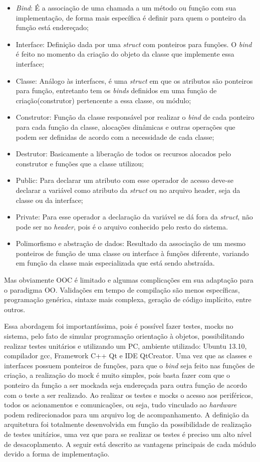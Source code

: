 \begin{itemize}
\item \emph{Bind}: É a associação de uma chamada a um método ou função com sua implementação, de forma mais específica é definir para quem o ponteiro da função está endereçado;
\item Interface: Definição dada por uma \emph{struct} com ponteiros para funções. O \emph{bind} é feito no momento da criação do objeto da classe que implemente essa interface;
\item Classe: Análogo às interfaces, é uma \emph{struct} em que os atributos são ponteiros para função, entretanto tem os \emph{binds} definidos em uma função de criação(construtor) pertencente a essa classe, ou módulo;
\item Construtor: Função da classe responsável por realizar o \emph{bind} de cada ponteiro para cada função da classe, alocações dinâmicas e outras operações que podem ser definidas de acordo com a necessidade de cada classe;
\item Destrutor: Basicamente a liberação de todos os recursos alocados pelo construtor e funções que a classe utilizou;
\item Public: Para declarar um atributo com esse operador de acesso deve-se declarar a variável como atributo da \emph{struct} ou no arquivo header, seja da classe ou da interface;
\item Private: Para esse operador a declaração da variável se dá fora da \emph{struct}, não pode ser no \emph{header}, pois é o arquivo conhecido pelo resto do sistema.
\item Polimorfismo e abstração de dados: Resultado da associação de um mesmo ponteiros de função de uma classe ou interface à funções diferente, variando em função da classe mais especializada que está sendo abstraída.
\end{itemize}

Mas obviamente OOC é limitado e algumas complicações em sua adaptação para o paradigma OO. Validações em tempo de compilação são menos específicas, programação genérica, sintaxe mais complexa, geração de código implícito, entre outros.

Essa abordagem foi importantíssima, pois é possível fazer testes, mocks no sistema, pelo fato de simular programação orientação à objetos, possibilitando realizar testes unitários e utilizando um PC, ambiente utilizado: Ubuntu 13.10, compilador gcc, Framework C++ Qt e IDE QtCreator. Uma vez que as classes e interfaces possuem ponteiros de funções, para que o \emph{bind} seja feito nas funções de criação, a realização do mock é muito simples, pois basta fazer com que o ponteiro da função a ser mockada seja endereçada para outra função de acordo com o teste a ser realizado. Ao realizar os testes e mocks o acesso aos periféricos, todos os acionamentos e comunicações, ou seja, tudo vinculado ao \emph{hardware} podem redirecionados para um arquivo log de acompanhamento. A definição da arquitetura foi totalmente desenvolvida em função da possibilidade de realização de testes unitários, uma vez que para se realizar os testes é preciso um alto nível de desacoplamento. A seguir está descrito as vantagens principais de cada módulo devido a forma de implementação.

